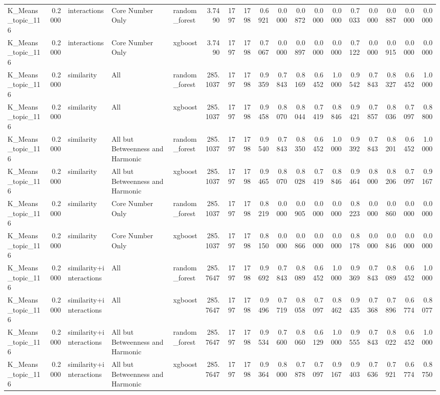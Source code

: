 \begin{tabular}{lrlllrrrrrrrrrrrrr}
K_Means_topic_116 & 0.2000 & interactions & Core Number Only & random_forest & 3.7490 & 1797 & 1798 & 0.6921 & 0.0000 & 0.0872 & 0.0000 & 0.0000 & 0.7033 & 0.0000 & 0.0887 & 0.0000 & 0.0000 \\
K_Means_topic_116 & 0.2000 & interactions & Core Number Only & xgboost & 3.7490 & 1797 & 1798 & 0.7067 & 0.0000 & 0.0897 & 0.0000 & 0.0000 & 0.7122 & 0.0000 & 0.0915 & 0.0000 & 0.0000 \\
K_Means_topic_116 & 0.2000 & similarity & All & random_forest & 285.1037 & 1797 & 1798 & 0.9359 & 0.7843 & 0.8169 & 0.6452 & 1.0000 & 0.9542 & 0.7843 & 0.8327 & 0.6452 & 1.0000 \\
K_Means_topic_116 & 0.2000 & similarity & All & xgboost & 285.1037 & 1797 & 1798 & 0.9458 & 0.8070 & 0.8044 & 0.7419 & 0.8846 & 0.9421 & 0.7857 & 0.8036 & 0.7097 & 0.8800 \\
K_Means_topic_116 & 0.2000 & similarity & All but Betweenness and Harmonic & random_forest & 285.1037 & 1797 & 1798 & 0.9540 & 0.7843 & 0.8350 & 0.6452 & 1.0000 & 0.9392 & 0.7843 & 0.8201 & 0.6452 & 1.0000 \\
K_Means_topic_116 & 0.2000 & similarity & All but Betweenness and Harmonic & xgboost & 285.1037 & 1797 & 1798 & 0.9465 & 0.8070 & 0.8028 & 0.7419 & 0.8846 & 0.9464 & 0.8000 & 0.8206 & 0.7097 & 0.9167 \\
K_Means_topic_116 & 0.2000 & similarity & Core Number Only & random_forest & 285.1037 & 1797 & 1798 & 0.8219 & 0.0000 & 0.0905 & 0.0000 & 0.0000 & 0.8223 & 0.0000 & 0.0860 & 0.0000 & 0.0000 \\
K_Means_topic_116 & 0.2000 & similarity & Core Number Only & xgboost & 285.1037 & 1797 & 1798 & 0.8150 & 0.0000 & 0.0866 & 0.0000 & 0.0000 & 0.8178 & 0.0000 & 0.0846 & 0.0000 & 0.0000 \\
K_Means_topic_116 & 0.2000 & similarity+interactions & All & random_forest & 285.7647 & 1797 & 1798 & 0.9692 & 0.7843 & 0.8089 & 0.6452 & 1.0000 & 0.9369 & 0.7843 & 0.8089 & 0.6452 & 1.0000 \\
K_Means_topic_116 & 0.2000 & similarity+interactions & All & xgboost & 285.7647 & 1797 & 1798 & 0.9496 & 0.7719 & 0.8058 & 0.7097 & 0.8462 & 0.9435 & 0.7368 & 0.7896 & 0.6774 & 0.8077 \\
K_Means_topic_116 & 0.2000 & similarity+interactions & All but Betweenness and Harmonic & random_forest & 285.7647 & 1797 & 1798 & 0.9534 & 0.7600 & 0.8060 & 0.6129 & 1.0000 & 0.9555 & 0.7843 & 0.8022 & 0.6452 & 1.0000 \\
K_Means_topic_116 & 0.2000 & similarity+interactions & All but Betweenness and Harmonic & xgboost & 285.7647 & 1797 & 1798 & 0.9364 & 0.8000 & 0.7878 & 0.7097 & 0.9167 & 0.9403 & 0.7636 & 0.7921 & 0.6774 & 0.8750 \\

\end{tabular}
